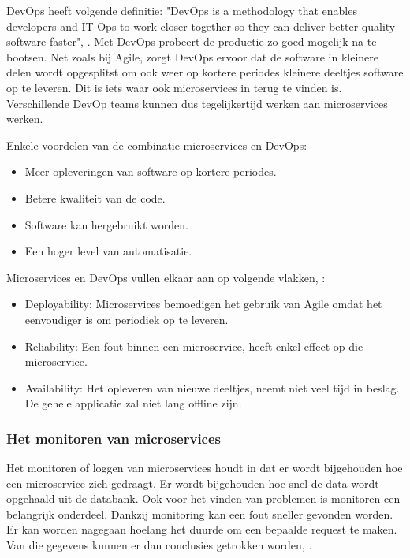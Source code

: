 DevOps heeft volgende definitie: "DevOps is a methodology that enables developers and IT Ops to work closer together so they can deliver better quality software faster", \textcite{Morgan2019}. Met DevOps probeert de productie zo goed mogelijk na te bootsen. Net zoals bij Agile, zorgt DevOps ervoor dat de software in kleinere delen wordt opgesplitst om ook weer op kortere periodes kleinere deeltjes software op te leveren. Dit is iets waar ook microservices in terug te vinden is. Verschillende DevOp teams kunnen dus tegelijkertijd werken aan microservices werken.

Enkele voordelen van de combinatie microservices en DevOps:
\begin{itemize}
	\item Meer opleveringen van software op kortere periodes.
	\item Betere kwaliteit van de code.
	\item Software kan hergebruikt worden.
	\item Een hoger level van automatisatie.
\end{itemize}

Microservices en DevOps vullen elkaar aan op volgende vlakken, \textcite{Mulesoft2019}:
\begin{itemize}
	\item Deployability: Microservices bemoedigen het gebruik van Agile omdat het eenvoudiger is om periodiek op te leveren. 
	\item Reliability: Een fout binnen een microservice, heeft enkel effect op die microservice. 
	\item Availability: Het opleveren van nieuwe deeltjes, neemt niet veel tijd in beslag. De gehele applicatie zal niet lang offline zijn.
\end{itemize}




\subsubsection{Het monitoren van microservices}
Het monitoren of loggen van microservices houdt in dat er wordt bijgehouden hoe een microservice zich gedraagt. Er wordt bijgehouden hoe snel de data wordt opgehaald uit de databank. Ook voor het vinden van problemen is monitoren een belangrijk onderdeel. Dankzij monitoring kan een fout sneller gevonden worden. Er kan worden nagegaan hoelang het duurde om een bepaalde request te maken. Van die gegevens kunnen er dan conclusies getrokken worden, \textcite{Ananthasubramanian2018}.



